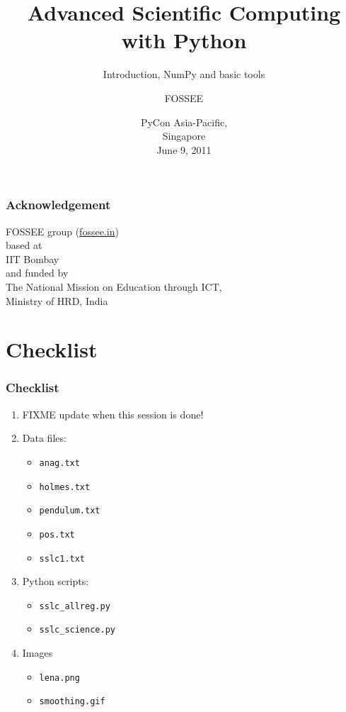 \documentclass[14pt,compress]{beamer}
\title[Advanced Sci Comp.]{Advanced Scientific Computing with
Python}
\subtitle{Introduction, NumPy and basic tools}
\author[FOSSEE group] {FOSSEE}
\institute[IIT Bombay] {Department of Aerospace Engineering\\IIT Bombay}
\date[] {PyCon Asia-Pacific,\\
Singapore\\
June 9, 2011
}
\newcommand{\typ}[1]{\lstinline{#1}}
\begin{document}
\begin{frame}
  \maketitle
\end{frame}


\begin{frame}
    \frametitle{Acknowledgement}
    \Large
    \begin{center}
        \alert{FOSSEE group (\url{fossee.in})} \\
        based at\\ 
        \alert{IIT Bombay}\\
        and funded by\\
        The National Mission on Education through ICT, \\
        \alert{Ministry of HRD, India}
    \end{center}
\end{frame}

\section{Checklist}
\begin{frame}
\frametitle{Checklist}
  \begin{enumerate}
    \item \alert{FIXME update when this session is done!}
    \item Data files: 
      \begin{itemize}
      \item \typ{anag.txt}
      \item \typ{holmes.txt}
      \item \typ{pendulum.txt}
      \item \typ{pos.txt}
      \item \typ{sslc1.txt}
      \end{itemize}
    \item Python scripts: 
      \begin{itemize}
      \item \typ{sslc_allreg.py}
      \item \typ{sslc_science.py}
      \end{itemize}
    \item Images
      \begin{itemize}
      \item \typ{lena.png}
      \item \typ{smoothing.gif}
      \end{itemize}
  \end{enumerate}
\end{frame}
\end{document}
